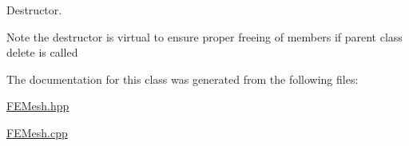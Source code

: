 Destructor. 

Note the destructor is virtual to ensure proper freeing of members if parent class delete is called 

The documentation for this class was generated from the following files\+:\begin{DoxyCompactItemize}
\item 
\mbox{\hyperlink{_f_e_mesh_8hpp}{F\+E\+Mesh.\+hpp}}\item 
\mbox{\hyperlink{_f_e_mesh_8cpp}{F\+E\+Mesh.\+cpp}}\end{DoxyCompactItemize}
